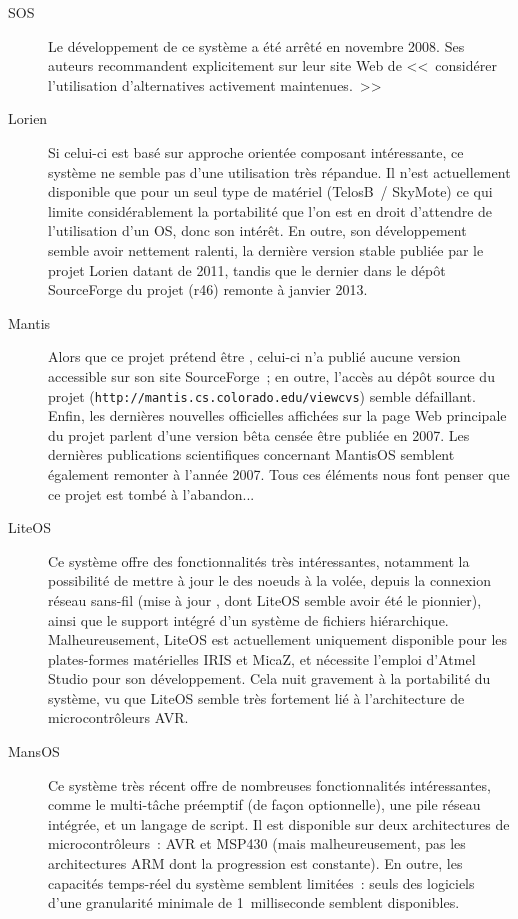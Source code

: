 \begin{description}

\item[SOS] \cite{SOS}
Le développement de ce système a été arrêté en novembre 2008. Ses auteurs
recommandent explicitement sur leur site Web de <<~considérer l'utilisation
d'alternatives activement maintenues.~>>

\item[Lorien] \cite{LorienOS}
Si celui-ci est basé sur approche orientée composant intéressante,
ce système ne semble pas d'une utilisation très répandue. Il n'est
actuellement disponible que pour un seul type de matériel (TelosB~/
SkyMote) ce qui limite considérablement la portabilité que l'on est
en droit d'attendre de l'utilisation d'un OS, donc son intérêt.
En outre, son développement semble avoir nettement ralenti,
la dernière version stable publiée par le projet Lorien datant de 2011,
tandis que le dernier  dans le dépôt SourceForge du
projet (r46) remonte à janvier 2013.

\item[Mantis] \cite{MantisOS}
Alors que ce projet prétend être , celui-ci n'a
publié aucune version accessible sur son site SourceForge~; en outre,
l'accès au dépôt source du projet
(\texttt{http://mantis.cs.colorado.edu/viewcvs}) semble défaillant.
Enfin, les dernières nouvelles officielles affichées sur la page Web
principale du projet parlent d'une version bêta censée être publiée en 2007.
Les dernières publications scientifiques concernant MantisOS semblent
également remonter à l'année 2007. Tous ces éléments nous font penser
que ce projet est tombé à l'abandon...

\item[LiteOS] \cite{LiteOS}
Ce système offre des fonctionnalités très intéressantes, notamment
la possibilité de mettre à jour le  des noeuds à la
volée, depuis la connexion réseau sans-fil (mise à jour
, dont LiteOS semble avoir été le pionnier),
ainsi que le support intégré d'un système de fichiers hiérarchique.
Malheureusement, LiteOS est actuellement uniquement disponible pour
les plates-formes matérielles IRIS et MicaZ, et nécessite l'emploi
d'Atmel Studio pour son développement. Cela nuit gravement à la
portabilité du système, vu que LiteOS semble très fortement lié
à l'architecture de microcontrôleurs AVR.

\item[MansOS] \cite{MansOS}
Ce système très récent offre de nombreuses fonctionnalités
intéressantes, comme le multi-tâche préemptif (de façon optionnelle),
une pile réseau intégrée, et un langage de script. Il est disponible
sur deux architectures de microcontrôleurs~: AVR et MSP430 (mais
malheureusement, pas les architectures ARM dont la progression est
constante). En outre, les capacités temps-réel du système semblent
limitées~: seuls des  logiciels d'une granularité
minimale de 1~milliseconde semblent disponibles.


\end{description}
